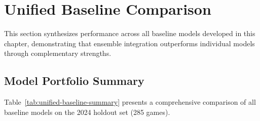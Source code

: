 \section{Unified Baseline Comparison}
\label{sec:unified-baseline-comparison}

This section synthesizes performance across all baseline models developed in this chapter, demonstrating that ensemble integration outperforms individual models through complementary strengths.

\subsection{Model Portfolio Summary}

Table~\ref{tab:unified-baseline-summary} presents a comprehensive comparison of all baseline models on the 2024 holdout set (285 games).

